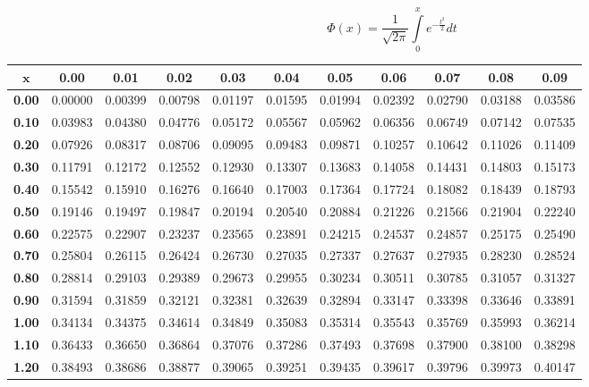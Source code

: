 $$\Phi(x) = \frac{1}{\sqrt{2 \pi}} \int\limits_0^x e^{-\frac{t^2}{2}} dt$$
\noindent \begin{tabular}{|c|c|c|c|c|c|c|c|c|c|c|}
\hline
$\pmb{x}$ & \textbf{ 0.00 } & \textbf{ 0.01 } & \textbf{ 0.02 } & \textbf{ 0.03 } & \textbf{ 0.04 } & \textbf{ 0.05 } & \textbf{ 0.06 } & \textbf{ 0.07 } & \textbf{ 0.08 } & \textbf{ 0.09 } \\ 
 \hline 
\textbf{ 0.00 } & 0.00000 & 0.00399 & 0.00798 & 0.01197 & 0.01595 & 0.01994 & 0.02392 & 0.02790 & 0.03188 & 0.03586\\ 
\hline
\textbf{ 0.10 } & 0.03983 & 0.04380 & 0.04776 & 0.05172 & 0.05567 & 0.05962 & 0.06356 & 0.06749 & 0.07142 & 0.07535\\ 
\hline
\textbf{ 0.20 } & 0.07926 & 0.08317 & 0.08706 & 0.09095 & 0.09483 & 0.09871 & 0.10257 & 0.10642 & 0.11026 & 0.11409\\ 
\hline
\textbf{ 0.30 } & 0.11791 & 0.12172 & 0.12552 & 0.12930 & 0.13307 & 0.13683 & 0.14058 & 0.14431 & 0.14803 & 0.15173\\ 
\hline
\textbf{ 0.40 } & 0.15542 & 0.15910 & 0.16276 & 0.16640 & 0.17003 & 0.17364 & 0.17724 & 0.18082 & 0.18439 & 0.18793\\ 
\hline
\textbf{ 0.50 } & 0.19146 & 0.19497 & 0.19847 & 0.20194 & 0.20540 & 0.20884 & 0.21226 & 0.21566 & 0.21904 & 0.22240\\ 
\hline
\textbf{ 0.60 } & 0.22575 & 0.22907 & 0.23237 & 0.23565 & 0.23891 & 0.24215 & 0.24537 & 0.24857 & 0.25175 & 0.25490\\ 
\hline
\textbf{ 0.70 } & 0.25804 & 0.26115 & 0.26424 & 0.26730 & 0.27035 & 0.27337 & 0.27637 & 0.27935 & 0.28230 & 0.28524\\ 
\hline
\textbf{ 0.80 } & 0.28814 & 0.29103 & 0.29389 & 0.29673 & 0.29955 & 0.30234 & 0.30511 & 0.30785 & 0.31057 & 0.31327\\ 
\hline
\textbf{ 0.90 } & 0.31594 & 0.31859 & 0.32121 & 0.32381 & 0.32639 & 0.32894 & 0.33147 & 0.33398 & 0.33646 & 0.33891\\ 
\hline
\textbf{ 1.00 } & 0.34134 & 0.34375 & 0.34614 & 0.34849 & 0.35083 & 0.35314 & 0.35543 & 0.35769 & 0.35993 & 0.36214\\ 
\hline
\textbf{ 1.10 } & 0.36433 & 0.36650 & 0.36864 & 0.37076 & 0.37286 & 0.37493 & 0.37698 & 0.37900 & 0.38100 & 0.38298\\ 
\hline
\textbf{ 1.20 } & 0.38493 & 0.38686 & 0.38877 & 0.39065 & 0.39251 & 0.39435 & 0.39617 & 0.39796 & 0.39973 & 0.40147\\ 
\hline

\end{tabular}
